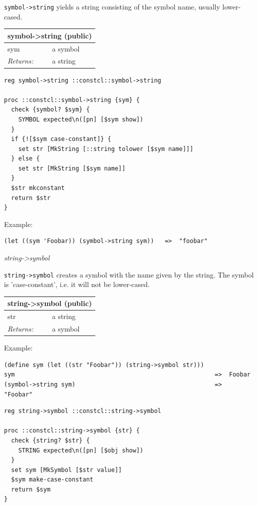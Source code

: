 \documentclass[twoside,9pt]{report}
\begin{document}
\texttt{symbol->string} yields a string consisting of the symbol name, usually lower-cased.

\begin{tabular}{ |l l| }
\hline
\multicolumn{2}{|l|}{symbol->string (public)} \\
\hline
sym & a symbol \\
\textit{Returns:} & a string \\
\hline
\end{tabular}

\noindent\makebox[\linewidth]{\rule{\linewidth}{0.4pt}}
\begin{lstlisting}
reg symbol->string ::constcl::symbol->string
 
proc ::constcl::symbol->string {sym} {
  check {symbol? $sym} {
    SYMBOL expected\n([pn] [$sym show])
  }
  if {![$sym case-constant]} {
    set str [MkString [::string tolower [$sym name]]]
  } else {
    set str [MkString [$sym name]]
  }
  $str mkconstant
  return $str
}
\end{lstlisting}
\noindent\makebox[\linewidth]{\rule{\linewidth}{0.4pt}}

Example:

\noindent\makebox[\linewidth]{\rule{\linewidth}{0.4pt}}
\begin{lstlisting}
(let ((sym 'Foobar)) (symbol->string sym))   =>  "foobar"
\end{lstlisting}
\noindent\makebox[\linewidth]{\rule{\linewidth}{0.4pt}}

\emph{string->symbol}


\texttt{string->symbol} creates a symbol with the name given by the string. The symbol is 'case-constant', i.e. it will not be lower-cased.

\begin{tabular}{ |l l| }
\hline
\multicolumn{2}{|l|}{string->symbol (public)} \\
\hline
str & a string \\
\textit{Returns:} & a symbol \\
\hline
\end{tabular}


Example:

\noindent\makebox[\linewidth]{\rule{\linewidth}{0.4pt}}
\begin{lstlisting}
(define sym (let ((str "Foobar")) (string->symbol str)))
sym                                                        =>  Foobar
(symbol->string sym)                                       =>  "Foobar"
\end{lstlisting}
\noindent\makebox[\linewidth]{\rule{\linewidth}{0.4pt}}
\noindent\makebox[\linewidth]{\rule{\linewidth}{0.4pt}}
\begin{lstlisting}
reg string->symbol ::constcl::string->symbol
 
proc ::constcl::string->symbol {str} {
  check {string? $str} {
    STRING expected\n([pn] [$obj show])
  }
  set sym [MkSymbol [$str value]]
  $sym make-case-constant
  return $sym
}
\end{lstlisting}
\noindent\makebox[\linewidth]{\rule{\linewidth}{0.4pt}}
\end{document}
